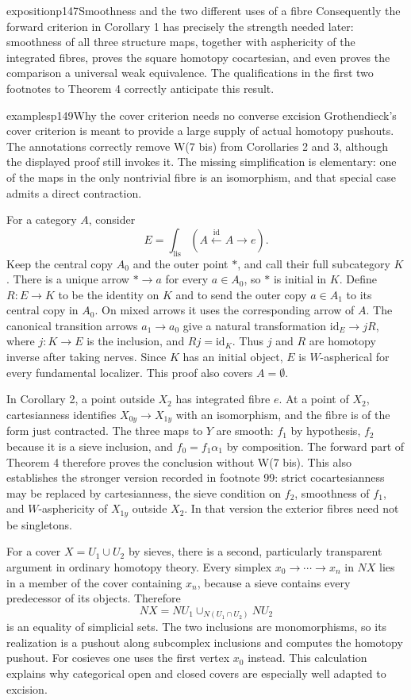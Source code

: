 \begin{dcomment}{exposition}{p147}{Smoothness and the two different uses of a fibre}
Consequently the forward criterion in Corollary 1 has precisely the strength needed later: smoothness of all three structure maps, together with asphericity of the integrated fibres, proves the square homotopy cocartesian, and even proves the comparison a universal weak equivalence. The qualifications in the first two footnotes to Theorem 4 correctly anticipate this result.
\end{dcomment}

\begin{dcomment}{examples}{p149}{Why the cover criterion needs no converse excision}
Grothendieck's cover criterion is meant to provide a large supply of actual homotopy pushouts. The annotations correctly remove W(7 bis) from Corollaries 2 and 3, although the displayed proof still invokes it. The missing simplification is elementary: one of the maps in the only nontrivial fibre is an isomorphism, and that special case admits a direct contraction.

For a category $A$, consider
\[
 E=\int_{\mathrm{lis}}(A\xleftarrow{\mathrm{id}}A\longrightarrow e).
\]
Keep the central copy $A_0$ and the outer point $*$, and call their full subcategory $K$. There is a unique arrow $*\to a$ for every $a\in A_0$, so $*$ is initial in $K$. Define $R:E\to K$ to be the identity on $K$ and to send the outer copy $a\in A_1$ to its central copy in $A_0$. On mixed arrows it uses the corresponding arrow of $A$. The canonical transition arrows $a_1\to a_0$ give a natural transformation $\mathrm{id}_E\to jR$, where $j:K\to E$ is the inclusion, and $Rj=\mathrm{id}_K$. Thus $j$ and $R$ are homotopy inverse after taking nerves. Since $K$ has an initial object, $E$ is $W$-aspherical for every fundamental localizer. This proof also covers $A=\emptyset$.

In Corollary 2, a point outside $X_2$ has integrated fibre $e$. At a point of $X_2$, cartesianness identifies $X_{0y}\to X_{1y}$ with an isomorphism, and the fibre is of the form just contracted. The three maps to $Y$ are smooth: $f_1$ by hypothesis, $f_2$ because it is a sieve inclusion, and $f_0=f_1\alpha_1$ by composition. The forward part of Theorem 4 therefore proves the conclusion without W(7 bis). This also establishes the stronger version recorded in footnote 99: strict cocartesianness may be replaced by cartesianness, the sieve condition on $f_2$, smoothness of $f_1$, and $W$-asphericity of $X_{1y}$ outside $X_2$. In that version the exterior fibres need not be singletons.

For a cover $X=U_1\cup U_2$ by sieves, there is a second, particularly transparent argument in ordinary homotopy theory. Every simplex $x_0\to\cdots\to x_n$ in $NX$ lies in a member of the cover containing $x_n$, because a sieve contains every predecessor of its objects. Therefore
\[
 NX=NU_1\cup_{N(U_1\cap U_2)}NU_2
\]
is an equality of simplicial sets. The two inclusions are monomorphisms, so its realization is a pushout along subcomplex inclusions and computes the homotopy pushout. For cosieves one uses the first vertex $x_0$ instead. This calculation explains why categorical open and closed covers are especially well adapted to excision.


\end{dcomment}

